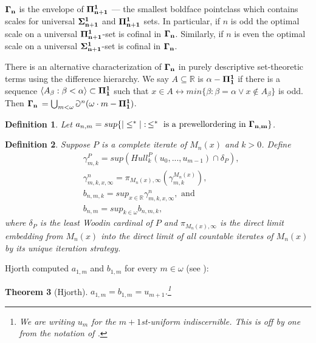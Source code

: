 \documentclass[12pt]{article}
\newtheorem{theorem}{Theorem}[section]
\newtheorem{definition}[theorem]{Definition}
\newcommand\R{\mathbb{R}}
\begin{document}
{$\bf{\Gamma_n}$ is the envelope of $\bf{\Pi^1_{n+1}}$ --- the smallest boldface pointclass which contains scales for universal $\bf{\Sigma^1_{n+1}}$ and $\bf{\Pi^1_{n+1}}$ sets.  In particular, if $n$ is odd the optimal scale on a universal $\bf{\Pi^1_{n+1}}$-set is cofinal in $\bf{\Gamma_n}$. Similarly, if $n$ is even the optimal scale on a universal $\bf{\Sigma^1_{n+1}}$-set is cofinal in $\bf{\Gamma_n}$.

There is an alternative characterization of $\bf{\Gamma_n}$ in purely descriptive set-theoretic terms using the difference hierarchy. We say $A\subseteq \R$ is $\alpha-\bf{\Pi^1_1}$ if there is a sequence $\langle A_\beta : \beta < \alpha\rangle\subset \bf{\Pi^1_1}$ such that $x\in A \longleftrightarrow min\{\beta : \beta = \alpha \vee x \notin A_\beta\}$ is odd. Then $\bf{\Gamma_n}$ $ = \bigcup_{m<\omega} \Game^n (\omega\cdot m - \bf{\Pi^1_1})$.

\begin{definition}
    Let $a_{n,m} = sup\{|\leq^*|:\,\leq^*\text{ is a prewellordering in }\bf{\Gamma_{n,m}}\}$.
\end{definition}

\begin{definition}
    Suppose $P$ is a complete iterate of $M_n(x)$ and $k>0$. Define
    \begin{align*}
        &\gamma^P_{m,k}= sup(Hull^P_k(u_0,...,u_{m-1})\cap \delta_P),\\
        &\gamma^n_{m,k,x,\infty} = \pi_{M_n(x),\infty}(\gamma^{M_n(x)}_{m,k}),\\
        &b_{n,m,k} = sup_{x\in\R} \gamma^n_{m,k,x,\infty},\text{ and}\\
        &b_{n,m} = sup_{k\in\omega} b_{n,m,k},
    \end{align*}
    where $\delta_P$ is the least Woodin cardinal of $P$ and $\pi_{M_n(x),\infty}$ is the direct limit embedding from $M_n(x)$ into the direct limit of all countable iterates of $M_n(x)$ by its unique iteration strategy.
\end{definition}

Hjorth computed $a_{1,m}$ and $b_{1,m}$ for every $m\in \omega$ (see \cite{bddness_lemma}):

\begin{theorem}[Hjorth]
\label{hjorth pwo thm}
    $a_{1,m} = b_{1,m} = u_{m+1}$.\footnote{We are writing $u_m$ for the $m+1$st-uniform indiscernible. This is off by one from the notation of \cite{bddness_lemma}.}
\end{theorem}

}
\end{document}
